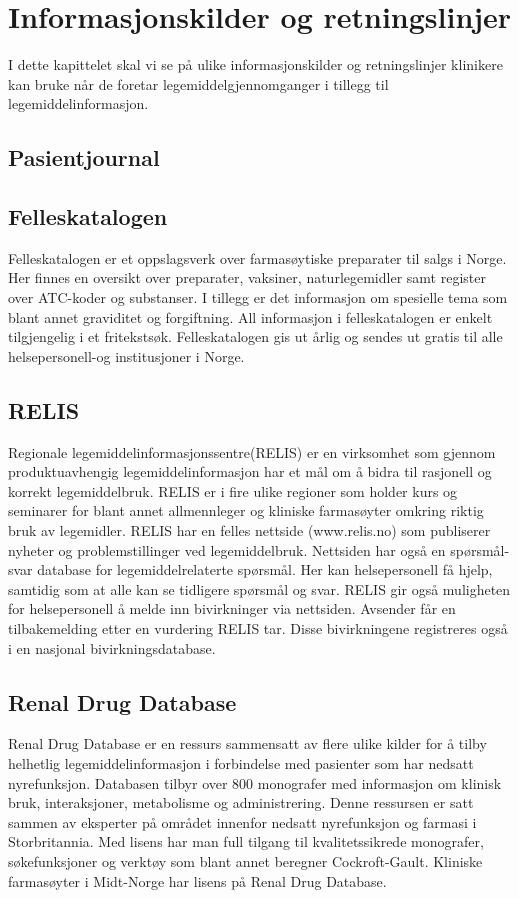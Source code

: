 \section{Informasjonskilder og retningslinjer} \label{Informasjonskilder_og_retningslinjer}
I dette kapittelet skal vi se på ulike informasjonskilder og retningslinjer klinikere kan bruke når de foretar legemiddelgjennomganger i tillegg til legemiddelinformasjon.
\subsection{Pasientjournal} 
\subsection{Felleskatalogen}
Felleskatalogen er et oppslagsverk over farmasøytiske preparater til salgs i Norge. Her finnes en oversikt over preparater, vaksiner, naturlegemidler samt register over ATC-koder og substanser. I tillegg er det informasjon om spesielle tema som blant annet graviditet og forgiftning. All informasjon i felleskatalogen er enkelt tilgjengelig i et fritekstsøk. Felleskatalogen gis ut årlig og sendes ut gratis til alle helsepersonell-og institusjoner i Norge.
\subsection{RELIS}
Regionale legemiddelinformasjonssentre(RELIS) er en virksomhet som gjennom produktuavhengig legemiddelinformasjon har et mål om å bidra til rasjonell og korrekt legemiddelbruk. RELIS er i fire ulike regioner som holder kurs og seminarer for blant annet allmennleger og kliniske farmasøyter omkring riktig bruk av legemidler. RELIS har en felles nettside (www.relis.no) som publiserer nyheter og problemstillinger ved legemiddelbruk. Nettsiden har også en spørsmål-svar database for legemiddelrelaterte spørsmål. Her kan helsepersonell få hjelp, samtidig som at alle kan se tidligere spørsmål og svar. RELIS gir også muligheten for helsepersonell å melde inn bivirkninger via nettsiden. Avsender får en tilbakemelding etter en vurdering RELIS tar. Disse bivirkningene registreres også i en nasjonal bivirkningsdatabase.
\subsection{Renal Drug Database}
Renal Drug Database er en ressurs sammensatt av flere ulike kilder for å tilby helhetlig legemiddelinformasjon i forbindelse med pasienter som har nedsatt nyrefunksjon. Databasen tilbyr over 800 monografer med informasjon om klinisk bruk, interaksjoner, metabolisme og administrering. Denne ressursen er satt sammen av eksperter på området innenfor nedsatt nyrefunksjon og farmasi i Storbritannia. Med lisens har man full tilgang til kvalitetssikrede monografer, søkefunksjoner og verktøy som blant annet beregner Cockroft-Gault. Kliniske farmasøyter i Midt-Norge har lisens på Renal Drug Database.
